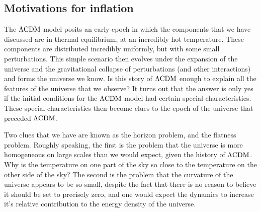     \subsection{Motivations for inflation}
    The $\Lambda\text{CDM}$ model posits an early epoch in which the components that
    we have discussed are in thermal equilibrium,
    at an incredibly hot temperature.
    These components are distributed incredibly uniformly, but with some small perturbations.
    This simple scenario then evolves under the expansion of the universe
    and the gravitational collapse of perturbations (and other interactions) and forms the universe we know.
    Is this story of $\Lambda\text{CDM}$ enough to explain all the features of the
    universe that we observe?
    It turns out that the answer is only yes if the initial conditions for the $\Lambda\text{CDM}$
    model had certain special characteristics.
    These special characteristics then become clues to the epoch of the universe
    that preceded $\Lambda\text{CDM}$.


    Two clues that we have are known as the horizon problem, and the flatness problem.
    Roughly speaking, the first is the problem that the universe is more homogeneous on
    large scales than we would expect, given the history of $\Lambda\text{CDM}$. Why is the temperature on one
    part of the sky so close to the temperature on the other side of the sky?
    The second is the problem that the curvature of the universe appears to be so
    small, despite the fact that there is no reason to believe it should be set to precisely
    zero, and one would expect the dynamics to increase it's relative contribution to the
    energy density of the universe.


